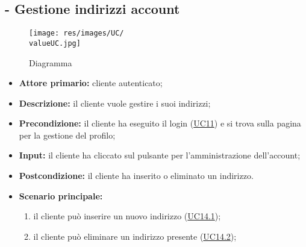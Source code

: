 \stepUserCase
\subsection{ - Gestione indirizzi account}
\begin{figure}[H]
    \centering
    \texttt{[image: res/images/UC/\\valueUC.jpg]}
    \caption{Diagramma }
\end{figure}
\begin{itemize}
    \item \textbf{Attore primario:} cliente autenticato;
    \item \textbf{Descrizione:} il cliente vuole gestire i suoi indirizzi;
    \item \textbf{Precondizione:} il cliente ha eseguito il login (\hyperref[UC11]{UC11}) e si trova sulla pagina per la gestione del profilo;
    \item \textbf{Input:} il cliente ha cliccato sul pulsante per l'amministrazione dell'account;
    \item \textbf{Postcondizione:} il cliente ha inserito o eliminato un indirizzo.
    \item \textbf{Scenario principale:}
          \begin{enumerate}
              \item il cliente può inserire un nuovo indirizzo (\hyperref[UC14.1]{UC14.1});
              \item il cliente può eliminare un indirizzo presente (\hyperref[UC14.2]{UC14.2});
          \end{enumerate}
\end{itemize}

\stepsubUserCase

